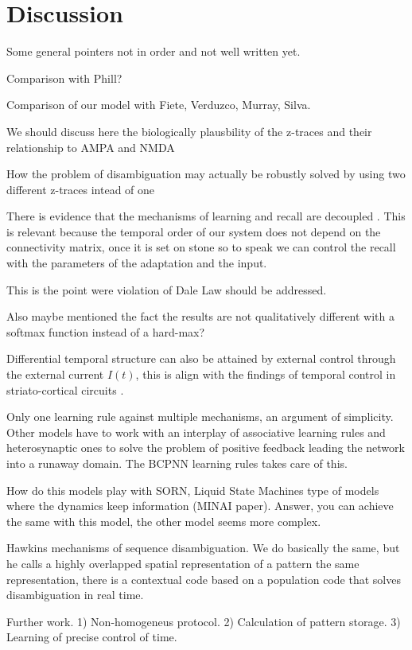 \documentclass[10pt,a4paper]{article}
\begin{document}
\section{Discussion}

Some general pointers not in order and not well written yet.

Comparison with Phill?

Comparison of our model with Fiete, Verduzco, Murray, Silva. 

We should discuss here the biologically plausbility of the z-traces and their relationship to AMPA and NMDA 

How the problem of disambiguation may actually be robustly solved by using two different z-traces intead of one

There is evidence that the mechanisms of learning and recall  are decoupled \cite{kawai2015motor}. This is relevant because the temporal order of our system does not depend on the connectivity matrix, once it is set on stone so to speak we can control the recall with the parameters of the adaptation and the input. 

This is the point were violation of Dale Law should be addressed. 

Also maybe mentioned the fact the results are not qualitatively different with a softmax function instead of a hard-max?

Differential temporal structure can also be attained by external control through the external current $I(t)$, this is align with the findings of temporal control in striato-cortical circuits \cite{murray2017learning}. 

Only one learning rule against multiple mechanisms, an argument of simplicity. Other models have to work with an interplay of associative learning rules and heterosynaptic ones to solve the problem of positive feedback leading the network into a runaway domain. The BCPNN learning rules takes care of this.

How do this models play with SORN, Liquid State Machines type of models where the dynamics keep information (MINAI paper). Answer, you can achieve the same with this model, the other model seems more complex.

Hawkins mechanisms of sequence disambiguation. We do basically the same, but he calls a highly overlapped spatial representation of a pattern the same representation, there is a contextual code based on a population code that solves disambiguation in real time. 

Further work. 1) Non-homogeneus protocol. 2) Calculation of pattern storage. 3) Learning of precise control of time.
\end{document}
